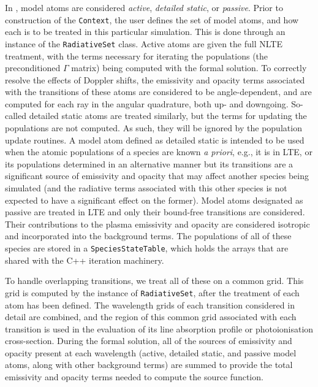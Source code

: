 In \Lw{}, model atoms are considered \emph{active}, \emph{detailed static}, or \emph{passive}.
Prior to construction of the \texttt{Context}, the user defines the set of model atoms, and how each is to be treated in this particular simulation.
This is done through an instance of the \texttt{RadiativeSet} class.
Active atoms are given the full NLTE treatment, with the terms necessary for iterating the populations (the preconditioned $\Gamma$ matrix) being computed with the formal solution.
To correctly resolve the effects of Doppler shifts, the emissivity and opacity terms associated with the transitions of these atoms are considered to be angle-dependent, and are computed for each ray in the angular quadrature, both up- and downgoing.
So-called detailed static atoms are treated similarly, but the terms for updating the populations are not computed.
As such, they will be ignored by the population update routines.
A model atom defined as detailed static is intended to be used when the atomic populations of a species are known \emph{a priori}, e.g., it is in LTE, or its populations determined in an alternative manner but its transitions are a significant source of emissivity and opacity that may affect another species being simulated (and the radiative terms associated with this other species is not expected to have a significant effect on the former).
Model atoms designated as passive are treated in LTE and only their bound-free transitions are considered.
Their contributions to the plasma emissivity and opacity are considered isotropic and incorporated into the background terms.
The populations of all of these species are stored in a \texttt{SpeciesStateTable}, which holds the arrays that are shared with the C++ iteration machinery.

To handle overlapping transitions, we treat all of these on a common grid.
This grid is computed by the instance of \texttt{RadiativeSet}, after the treatment of each atom has been defined.
The wavelength grids of each transition considered in detail are combined, and the region of this common grid associated with each transition is used in the evaluation of its line absorption profile or photoionisation cross-section.
During the formal solution, all of the sources of emissivity and opacity present at each wavelength (active, detailed static, and passive model atoms, along with other background terms) are summed to provide the total emissivity and opacity terms needed to compute the source function.

